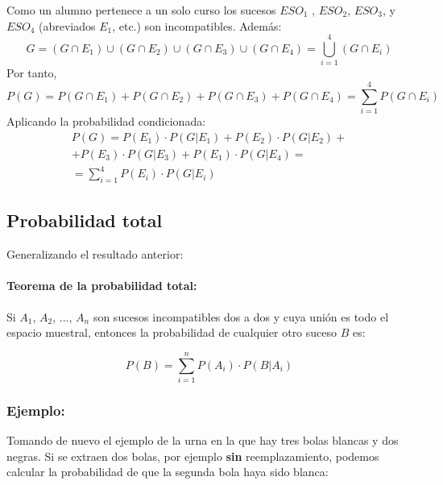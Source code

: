 

Como un alumno pertenece a un solo curso los sucesos $ESO_1$ , $ESO_2$, $ESO_3$, y $ESO_4$ (abreviados $E_1$, etc.) son incompatibles. Además: $$G=(G \cap E_1)\cup(G \cap E_2)\cup(G \cap E_3)\cup(G \cap E_4)=\bigcup_{i=1}^4(G \cap E_i)$$
Por tanto,
$$P(G)=P(G \cap E_1)+P(G \cap E_2)+P(G \cap E_3)+P(G \cap E_4)=\sum_{i=1}^4 P(G \cap E_i)$$
Aplicando la probabilidad condicionada:
\begin{eqnarray*}
P(G)=P(E_1)\cdot P(G|E_1)+P(E_2)\cdot P(G|E_2)+\\+P(E_3)\cdot P(G|E_3)+P(E_1)\cdot P(G|E_4)= \\ =\sum_{i=1}^4 P(E_i)\cdot  P(G|E_i)
\end{eqnarray*}

\subsection{Probabilidad total}
Generalizando el resultado anterior:

\paragraph{Teorema de la probabilidad total:} Si $A_1$, $A_2$, ..., $A_n$   son sucesos incompatibles dos a dos y cuya unión es todo el espacio muestral, entonces la probabilidad de cualquier otro suceso $B$ es:

$$P(B)=\sum_{i=1}^n P(A_i)\cdot  P(B|A_i) $$

\subsubsection{Ejemplo:} Tomando de nuevo el ejemplo de la urna en la que hay tres bolas blancas y dos negras. Si se extraen dos bolas, por ejemplo \textbf{sin} reemplazamiento, podemos calcular la probabilidad de que la segunda bola haya sido blanca: 

